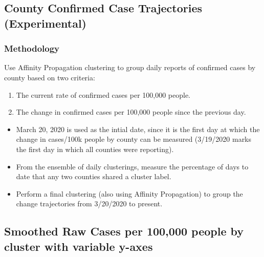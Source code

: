 \documentclass[]{article}
\providecommand{\tightlist}{%
  \setlength{\itemsep}{0pt}\setlength{\parskip}{0pt}}
\begin{document}
\newpage

\hypertarget{county-confirmed-case-trajectories-experimental}{%
\subsection{County Confirmed Case Trajectories
(Experimental)}\label{county-confirmed-case-trajectories-experimental}}

\hypertarget{methodology}{%
\subsubsection{Methodology}\label{methodology}}

Use Affinity Propagation clustering to group daily reports of confirmed
cases by county based on two criteria:

\begin{enumerate}
\def\labelenumi{\arabic{enumi}.}
\tightlist
\item
  The current rate of confirmed cases per 100,000 people.
\item
  The change in confirmed cases per 100,000 people since the previous
  day.
\end{enumerate}

\begin{itemize}
\item
  March 20, 2020 is used as the intial date, since it is the first day
  at which the change in cases/100k people by county can be measured
  (3/19/2020 marks the first day in which all counties were reporting).
\item
  From the ensemble of daily clusterings, measure the percentage of days
  to date that any two counties shared a cluster label.
\item
  Perform a final clustering (also using Affinity Propagation) to group
  the change trajectories from 3/20/2020 to present.
\end{itemize}

\hypertarget{smoothed-raw-cases-per-100000-people-by-cluster-with-variable-y-axes}{%
\subsection{Smoothed Raw Cases per 100,000 people by cluster with
variable
y-axes}\label{smoothed-raw-cases-per-100000-people-by-cluster-with-variable-y-axes}}
\end{document}
